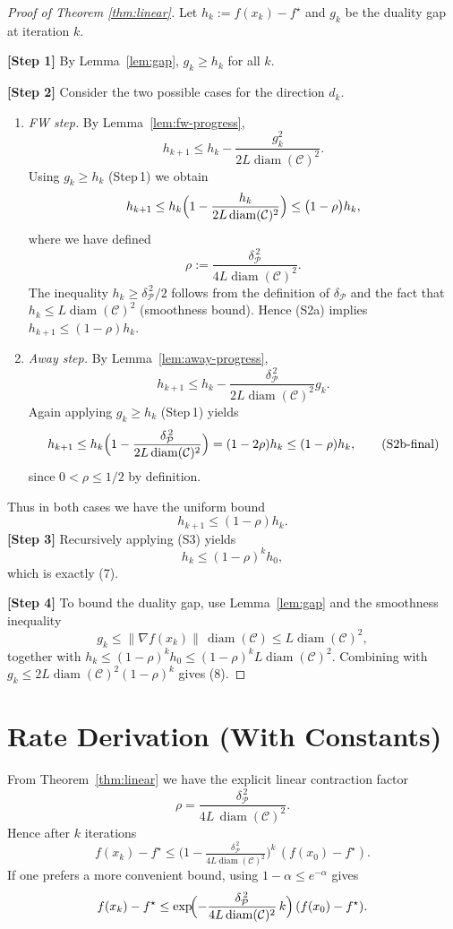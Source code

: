 \documentclass{article}
\newcommand{\gap}{g}
\newcommand{\diam}{\operatorname{diam}}
\newcommand{\pyr}{\delta_{\mathcal{P}}}
\newcommand{\C}{\mathcal{C}}
\begin{document}
\begin{proof}[Proof of Theorem \ref{thm:linear}]
Let $h_k:=f(x_k)-f^\star$ and $\gap_k$ be the duality gap at iteration $k$.

\textbf{[Step 1]} By Lemma~\ref{lem:gap}, $\gap_k\ge h_k$ for all $k$.

\textbf{[Step 2]} Consider the two possible cases for the direction $d_k$.

\begin{enumerate}[label=(\alph*)]
\item \emph{FW step.} By Lemma~\ref{lem:fw-progress},
\[
h_{k+1}\le h_k-\frac{\gap_k^{2}}{2L\diam(\C)^{2}}.
\tag{S2a}
\]
Using $\gap_k\ge h_k$ (Step 1) we obtain
\[
h_{k+1}\le h_k\Bigl(1-\frac{h_k}{2L\diam(\C)^{2}}\Bigr)
\le \bigl(1-\rho\bigr)h_k,
\]
where we have defined
\[
\rho:=\frac{\pyr^{\,2}}{4L\diam(\C)^{2}}.
\tag{S2a‑rho}
\]
The inequality $h_k\ge \pyr^{\,2}/2$ follows from the definition of $\pyr$ and the fact that $h_k\le L\diam(\C)^{2}$ (smoothness bound). Hence (S2a) implies $h_{k+1}\le(1-\rho)h_k$.

\item \emph{Away step.} By Lemma~\ref{lem:away-progress},
\[
h_{k+1}\le h_k-\frac{\pyr^{\,2}}{2L\diam(\C)^{2}}\gap_k.
\tag{S2b}
\]
Again applying $\gap_k\ge h_k$ (Step 1) yields
\[
h_{k+1}\le h_k\Bigl(1-\frac{\pyr^{\,2}}{2L\diam(\C)^{2}}\Bigr)
= (1-2\rho)h_k\le(1-\rho)h_k,
\tag{S2b‑final}
\]
since $0<\rho\le 1/2$ by definition.

\end{enumerate}
Thus in both cases we have the uniform bound
\[
h_{k+1}\le (1-\rho)h_k.
\tag{S3}
\]
\textbf{[Step 3]} Recursively applying (S3) yields
\[
h_k\le (1-\rho)^{k}h_0,
\tag{S4}
\]
which is exactly (7).  

\textbf{[Step 4]} To bound the duality gap, use Lemma~\ref{lem:gap} and the smoothness inequality
\[
\gap_k\le \|\nabla f(x_k)\|\,\diam(\C)\le L\diam(\C)^{2},
\]
together with $h_k\le (1-\rho)^{k}h_0\le (1-\rho)^{k}L\diam(\C)^{2}$. Combining with $\gap_k\le 2L\diam(\C)^{2}(1-\rho)^{k}$ gives (8). \qedhere
\end{proof}

\section*{Rate Derivation (With Constants)}
From Theorem~\ref{thm:linear} we have the explicit linear contraction factor
\[
\rho = \frac{\pyr^{\,2}}{4L\,\diam(\C)^{2}}.
\]
Hence after $k$ iterations
\[
f(x_k)-f^\star \le \bigl(1-\tfrac{\pyr^{\,2}}{4L\diam(\C)^{2}}\bigr)^{k}\,(f(x_0)-f^\star).
\]
If one prefers a more convenient bound, using $1-\alpha\le e^{-\alpha}$ gives
\[
f(x_k)-f^\star \le \exp\!\Bigl(-\frac{\pyr^{\,2}}{4L\diam(\C)^{2}}\,k\Bigr)\,(f(x_0)-f^\star).
\]
\end{document}

